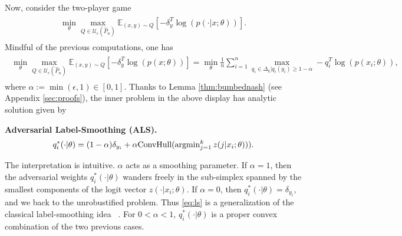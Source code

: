 Now, consider the two-player game
\begin{eqnarray}
  \begin{split}
    \min_{\theta}\max_{Q \in \mathcal U_\epsilon(\hat{P}_n)} \mathbb E_{(x,y)
      \sim Q}[-\delta_y^T\log(p(\cdot|x;\theta))].
  \end{split}
  \label{eq:grand}
\end{eqnarray}
Mindful of the previous computations, one has
\begin{eqnarray}
  \begin{split}
    \min_{\theta}\max_{Q \in \mathcal U_\epsilon(\hat{P}_n)} \mathbb E_{(x,y) \sim
      Q}[-\delta_y^T\log(p(x;\theta))]
    =\min_{\theta}\frac{1}{n}\sum_{i=1}^n\max_{q_i \in
      \Delta_k|q_i(y_i) \ge 1-\alpha} -q_i^T\log(p(x_i;\theta)),
    \end{split}
\end{eqnarray}
where  $\alpha := \min(\epsilon,1) \in [0, 1]$. Thanks to Lemma
\ref{thm:bumbednash} (see Appendix \ref{sec:proofs}), the inner problem in the above
display has analytic solution given by
\begin{mdframed}
  \textbf{Adversarial Label-Smoothing (ALS).}
\begin{eqnarray}
  q_i^*(\cdot|\theta) = (1-\alpha) \delta_{y_i} +
  \alpha\text{ConvHull}(\operatorname{argmin}_{j=1}^kz(j|x_i;\theta))).
  \label{eq:ls}
\end{eqnarray}
\end{mdframed}
The interpretation is intuitive. $\alpha$ acts as a smoothing parameter.
If $\alpha = 1$, then the adversarial weights $q^*_i(\cdot|\theta)$ wanders freely
in the sub-simplex spanned by the smallest components of the logit vector
$z(\cdot|x_i;\theta)$. If $\alpha=0$, then $q^*_i(\cdot|\theta)=\delta_{y_i}$,
and we back to the unrobustified problem. Thus \eqref{eq:ls} is a generalization
of the classical label-smoothing idea ~\citep{labelsmoothing,labelsmoothingbis}. For $0 < \alpha < 1$, $q^*_i(\cdot|\theta)$ is a
proper convex combination of the two previous cases.

